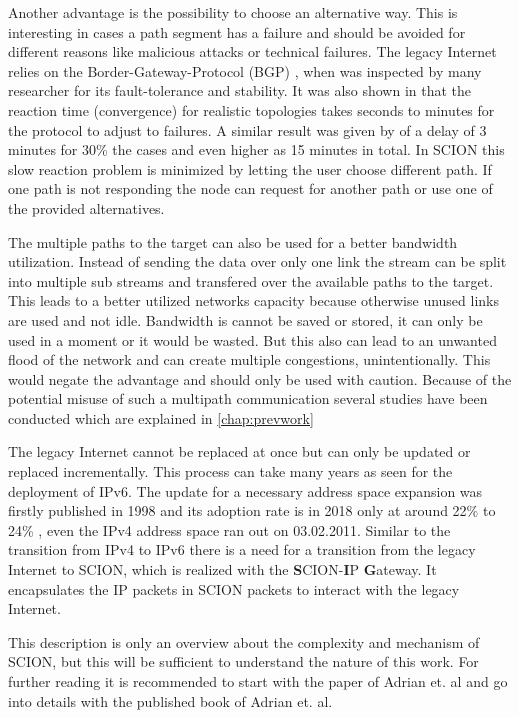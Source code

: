\documentclass[thesis.tex]{subfiles}
\begin{document}
Another advantage is the possibility to choose an alternative way. This is interesting in cases a path segment has a failure and should be avoided for different reasons like malicious attacks or technical failures. The legacy Internet relies on the Border-Gateway-Protocol (BGP) \cite{rekhter2005border, Halabi.1997}, when was inspected by many researcher for its fault-tolerance and stability. It was also shown in \cite{Sahoo.2006} that the reaction time (convergence) for realistic topologies takes seconds to minutes for the protocol to adjust to failures. A similar result was given by \cite{Labovitz.2001} of a delay of 3 minutes for 30\% the cases and even higher as 15 minutes in total. In SCION this slow reaction problem is minimized by letting the user choose different path. If one path is not responding the node can request for another path or use one of the provided alternatives.

The multiple paths to the target can also be used for a better bandwidth utilization. Instead of sending the data over only one link the stream can be split into multiple sub streams and transfered over the available paths to the target. 
This leads to a better utilized networks capacity because otherwise unused links are used and not idle. Bandwidth is cannot be saved or stored, it can only be used in a moment or it would be wasted. But this also can lead to an unwanted flood of the network and can create multiple congestions, unintentionally. This would negate the advantage and should only be used with caution. Because of the potential misuse of such a multipath communication several studies have been conducted which are explained in \autoref{chap:prevwork}

The legacy Internet cannot be replaced at once but can only be updated or replaced incrementally. This process can take many years as seen for the deployment of IPv6. The update for a necessary address space expansion was firstly published in 1998\cite{Deering.1998} and its adoption rate is in 2018 only at around 22\% \cite{GoogleInc.} to 24\% \cite{Ripenetworkcoordinationcentre.18.04.2018}, even the IPv4 address space ran out on 03.02.2011\cite{ICANN.03.02.2011}. Similar to the transition from IPv4 to IPv6 there is a need for a transition from the legacy Internet to SCION, which is realized with the \textbf{S}CION-\textbf{I}P \textbf{G}ateway. It encapsulates the IP packets in SCION packets to interact with the legacy Internet.

This description is only an overview about the complexity and mechanism of SCION, but this will be sufficient to understand the nature of this work. For further reading it is recommended to start with the paper of Adrian et. al\cite{SCIONPaper} and go into details with the published book of Adrian et. al\cite{SCIONBook}.
\end{document}
